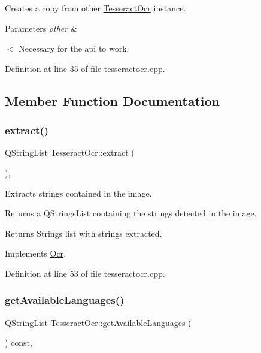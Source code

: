 Creates a copy from other \mbox{\hyperlink{classTesseractOcr}{Tesseract\+Ocr}} instance. 


\begin{DoxyParams}{Parameters}
{\em other} & \\
\hline
\end{DoxyParams}
$<$ Necessary for the api to work. 

Definition at line 35 of file tesseractocr.\+cpp.



\subsection{Member Function Documentation}
\mbox{\label{classTesseractOcr_a7e5a1d3e275f710ce187bc1c0b080327}} 
\subsubsection{\texorpdfstring{extract()}{extract()}}
{\footnotesize\ttfamily Q\+String\+List Tesseract\+Ocr\+::extract (\begin{DoxyParamCaption}{ }\end{DoxyParamCaption})\hspace{0.3cm}{\ttfamily [override]}, {\ttfamily [virtual]}}



Extracts strings contained in the image. 

Returns a Q\+Strings\+List containing the strings detected in the image. \begin{DoxyReturn}{Returns}
Strings list with strings extracted. 
\end{DoxyReturn}


Implements \mbox{\hyperlink{classOcr_a09a27b3a1f579c41ebda05f2a2cf4fed}{Ocr}}.



Definition at line 53 of file tesseractocr.\+cpp.

\mbox{\label{classTesseractOcr_ad3486dcaa8a478c72ebaf76c43671326}} 
\subsubsection{\texorpdfstring{get\+Available\+Languages()}{getAvailableLanguages()}}
{\footnotesize\ttfamily Q\+String\+List Tesseract\+Ocr\+::get\+Available\+Languages (\begin{DoxyParamCaption}{ }\end{DoxyParamCaption}) const\hspace{0.3cm}{\ttfamily [override]}, {\ttfamily [virtual]}}



